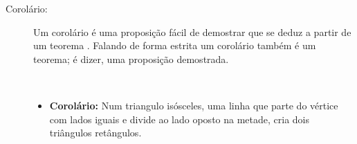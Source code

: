 \begin{description}
\item[Corolário:]  Um corolário é uma proposição 
fácil de demostrar que se deduz a partir de um teorema \cite[pp. 49]{fossa2009introducao} \cite[pp. 41]{solow1987como}.
Falando de forma estrita um corolário também é um teorema; é dizer, uma proposição demostrada.
\begin{example}~\\
\begin{itemize}
\item \textbf{Corolário:} Num triangulo isósceles, 
uma linha que parte do vértice com lados iguais e divide ao lado oposto na metade,
cria dois triângulos retângulos.
\end{itemize}
\end{example}

\end{description}
